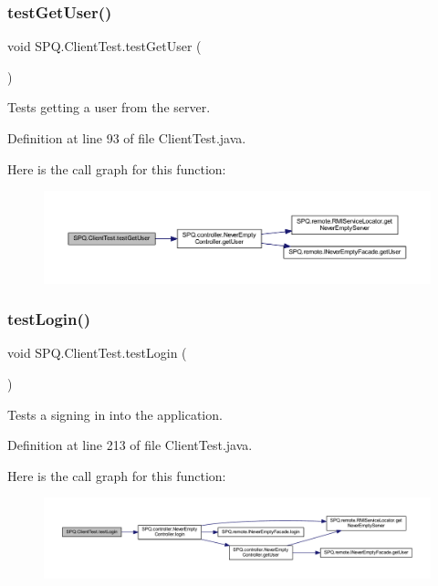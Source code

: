 \subsubsection{\texorpdfstring{test\+Get\+User()}{testGetUser()}}
{\footnotesize\ttfamily void S\+P\+Q.\+Client\+Test.\+test\+Get\+User (\begin{DoxyParamCaption}{ }\end{DoxyParamCaption})}

Tests getting a user from the server. 

Definition at line 93 of file Client\+Test.\+java.

Here is the call graph for this function\+:
\nopagebreak
\begin{figure}[H]
\begin{center}
\leavevmode
\includegraphics[width=350pt]{class_s_p_q_1_1_client_test_a611b894c9d3826db1d2104e2aae23267_cgraph}
\end{center}
\end{figure}
\mbox{\label{class_s_p_q_1_1_client_test_a88728d2e3535750655d518d73f81e22b}} 
\subsubsection{\texorpdfstring{test\+Login()}{testLogin()}}
{\footnotesize\ttfamily void S\+P\+Q.\+Client\+Test.\+test\+Login (\begin{DoxyParamCaption}{ }\end{DoxyParamCaption})}

Tests a signing in into the application. 

Definition at line 213 of file Client\+Test.\+java.

Here is the call graph for this function\+:
\nopagebreak
\begin{figure}[H]
\begin{center}
\leavevmode
\includegraphics[width=350pt]{class_s_p_q_1_1_client_test_a88728d2e3535750655d518d73f81e22b_cgraph}
\end{center}
\end{figure}
\mbox{\label{class_s_p_q_1_1_client_test_ac05d043ac92f1c1083d19eec58e5bbd9}} 
